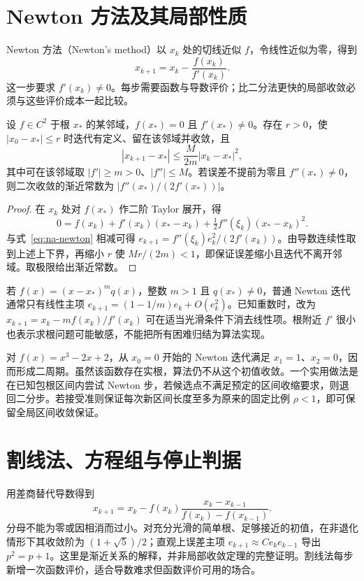 \documentclass[UTF8,12pt,a4paper,fontset=fandol]{ctexbook}
\begin{document}
\section{Newton 方法及其局部性质}
Newton 方法（Newton's method）以 $x_k$ 处的切线近似 $f$，令线性近似为零，得到
\begin{equation}
 x_{k+1}=x_k-\frac{f(x_k)}{f'(x_k)}.
 \label{eq:na-newton}
\end{equation}
这一步要求 $f'(x_k)\ne0$。每步需要函数与导数评价；比二分法更快的局部收敛必须与这些评价成本一起比较。

\begin{theorem}
\label{thm:na-newton}
设 $f\in C^2$ 于根 $x_*$ 的某邻域，$f(x_*)=0$ 且 $f'(x_*)\ne0$。存在 $r>0$，使 $|x_0-x_*|\le r$ 时迭代有定义、留在该邻域并收敛，且
\[
 |x_{k+1}-x_*|\le \frac{M}{2m}|x_k-x_*|^2,
\]
其中可在该邻域取 $|f'|\ge m>0$、$|f''|\le M$。若误差不提前为零且 $f''(x_*)\ne0$，则二次收敛的渐近常数为 $|f''(x_*)/(2f'(x_*))|$。
\end{theorem}
\begin{proof}
在 $x_k$ 处对 $f(x_*)$ 作二阶 Taylor 展开，得
\[
 0=f(x_k)+f'(x_k)(x_*-x_k)+\tfrac12 f''(\xi_k)(x_*-x_k)^2.
\]
与式~\eqref{eq:na-newton} 相减可得 $e_{k+1}=f''(\xi_k)e_k^2/(2f'(x_k))$。由导数连续性取到上述上下界，再缩小 $r$ 使 $Mr/(2m)<1$，即保证误差缩小且迭代不离开邻域。取极限给出渐近常数。
\end{proof}

若 $f(x)=(x-x_*)^m q(x)$，整数 $m>1$ 且 $q(x_*)\ne0$，普通 Newton 迭代通常只有线性主项 $e_{k+1}=(1-1/m)e_k+O(e_k^2)$。已知重数时，改为 $x_{k+1}=x_k-mf(x_k)/f'(x_k)$ 可在适当光滑条件下消去线性项。根附近 $f'$ 很小也表示求根问题可能敏感，不能把所有困难归结为算法实现。

\begin{example}[局部结论不能当作全局结论]
对 $f(x)=x^3-2x+2$，从 $x_0=0$ 开始的 Newton 迭代满足 $x_1=1$、$x_2=0$，因而形成二周期。虽然该函数存在实根，算法仍不从这个初值收敛。一个实用做法是在已知包根区间内尝试 Newton 步，若候选点不满足预定的区间收缩要求，则退回二分步。若接受准则保证每次新区间长度至多为原来的固定比例 $\rho<1$，即可保留全局区间收敛保证。
\end{example}

\section{割线法、方程组与停止判据}
用差商替代导数得到
\[
 x_{k+1}=x_k-f(x_k)\frac{x_k-x_{k-1}}{f(x_k)-f(x_{k-1})}.
\]
分母不能为零或因相消而过小。对充分光滑的简单根、足够接近的初值，在非退化情形下其收敛阶为 $(1+\sqrt5)/2$；直观上误差主项 $e_{k+1}\approx C e_ke_{k-1}$ 导出 $p^2=p+1$。这里是渐近关系的解释，并非局部收敛定理的完整证明。割线法每步新增一次函数评价，适合导数难求但函数评价可用的场合。
\end{document}
